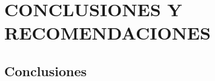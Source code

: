 \chapter{CONCLUSIONES Y RECOMENDACIONES}
\section{Conclusiones}
\begin{comment}
Hello, here is some text without a meaning.  This text should 
show what a printed text will look like at this place.  If you 
read this text, you will get no information.  Really?  Is there 
no information?  Is there a difference between this text and some 
nonsense like ``Huardest gefburn?  Kjift " not at all!...



\section{Recomendaciones}

Nisi porta lorem mollis aliquam ut porttitor leo. Aenean pharetra magna ac placerat vestibulum. Est placerat in egestas erat imperdiet sed euismod. Velit euismod in pellentesque massa placerat. Enim praesent elementum facilisis leo vel fringilla. Ante in nibh mauris cursus mattis molestie a iaculis. Erat pellentesque adipiscing commodo elit at imperdiet dui accumsan sit. Porttitor lacus luctus accumsan tortor posuere ac ut. Tortor at auctor urna nunc id. A iaculis at erat pellentesque adipiscing commodo elit. 

\end{comment}
